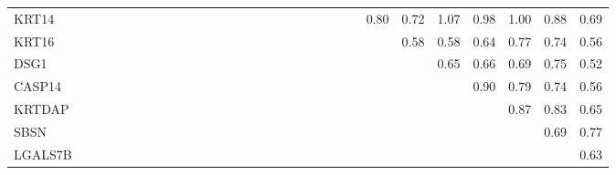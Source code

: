 \begin{longtable}{lrrrrrrrrrrrrrrrrrrrrrrrrrrrrr}
KRT14   &            &            &           &              &             &              &              &            &              &            &              &             &             &            &            &            &            &           &             &             &             &             &        0.80 &       0.72 &         1.07 &         0.98 &       1.00 &          0.88 &         0.69 \\
KRT16   &            &            &           &              &             &              &              &            &              &            &              &             &             &            &            &            &            &           &             &             &             &             &             &       0.58 &         0.58 &         0.64 &       0.77 &          0.74 &         0.56 \\
DSG1    &            &            &           &              &             &              &              &            &              &            &              &             &             &            &            &            &            &           &             &             &             &             &             &            &         0.65 &         0.66 &       0.69 &          0.75 &         0.52 \\
CASP14  &            &            &           &              &             &              &              &            &              &            &              &             &             &            &            &            &            &           &             &             &             &             &             &            &              &         0.90 &       0.79 &          0.74 &         0.56 \\
KRTDAP  &            &            &           &              &             &              &              &            &              &            &              &             &             &            &            &            &            &           &             &             &             &             &             &            &              &              &       0.87 &          0.83 &         0.65 \\
SBSN    &            &            &           &              &             &              &              &            &              &            &              &             &             &            &            &            &            &           &             &             &             &             &             &            &              &              &            &          0.69 &         0.77 \\
LGALS7B &            &            &           &              &             &              &              &            &              &            &              &             &             &            &            &            &            &           &             &             &             &             &             &            &              &              &            &               &         0.63 \\
\end{longtable}


